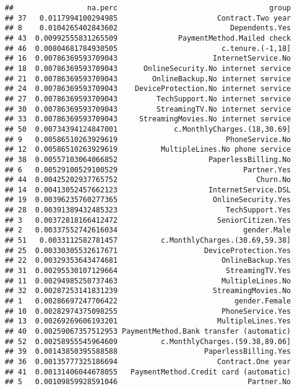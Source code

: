 \documentclass[
]{article}
\begin{document}
\begin{verbatim}
##                 na.perc                                   group
## 37   0.0117994100294985                       Contract.Two year
## 8    0.0104265402843602                          Dependents.Yes
## 43  0.00992555831265509              PaymentMethod.Mailed check
## 46  0.00804681784930505                        c.tenure.(-1,18]
## 16  0.00786369593709043                      InternetService.No
## 18  0.00786369593709043      OnlineSecurity.No internet service
## 21  0.00786369593709043        OnlineBackup.No internet service
## 24  0.00786369593709043    DeviceProtection.No internet service
## 27  0.00786369593709043         TechSupport.No internet service
## 30  0.00786369593709043         StreamingTV.No internet service
## 33  0.00786369593709043     StreamingMovies.No internet service
## 50  0.00734394124847001             c.MonthlyCharges.(18,30.69]
## 9   0.00586510263929619                         PhoneService.No
## 12  0.00586510263929619          MultipleLines.No phone service
## 38  0.00557103064066852                     PaperlessBilling.No
## 6   0.00529100529100529                             Partner.Yes
## 44  0.00425202937765752                                Churn.No
## 14  0.00413052457662123                     InternetService.DSL
## 19  0.00396235760277365                      OnlineSecurity.Yes
## 28  0.00391389432485323                         TechSupport.Yes
## 3   0.00372818166412472                       SeniorCitizen.Yes
## 2   0.00337552742616034                             gender.Male
## 51   0.0033112582781457          c.MonthlyCharges.(30.69,59.38]
## 25  0.00330305532617671                    DeviceProtection.Yes
## 22  0.00329353643474681                        OnlineBackup.Yes
## 31  0.00295530107129664                         StreamingTV.Yes
## 11  0.00294985250737463                        MultipleLines.No
## 32  0.00287253141831239                      StreamingMovies.No
## 1   0.00286697247706422                           gender.Female
## 10  0.00282974375098255                        PhoneService.Yes
## 13  0.00269269606193201                       MultipleLines.Yes
## 40  0.00259067357512953 PaymentMethod.Bank transfer (automatic)
## 52  0.00258955545964609          c.MonthlyCharges.(59.38,89.06]
## 39  0.00143850395588588                    PaperlessBilling.Yes
## 36  0.00135777325186694                       Contract.One year
## 41  0.00131406044678055   PaymentMethod.Credit card (automatic)
## 5   0.00109859928591046                              Partner.No

\end{verbatim}
\end{document}
